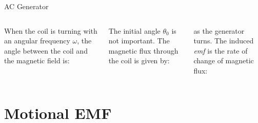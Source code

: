 \documentclass[12pt,aspectratio=169]{beamer}
\begin{document}
\begin{frame}{AC Generator}
  \begin{columns}

    When the coil is turning with an angular frequency $\omega$, the angle
    between the coil and the magnetic field is:
    

    \vspace{-.15in}The initial angle $\theta_0$ is not important. The magnetic
    flux through the coil is given by:
    

    \vspace{-.25in}as the generator turns. The induced \emph{emf} is the rate
    of change of magnetic flux:

  \end{columns}
\end{frame}



\section{Motional EMF}
\end{document}
